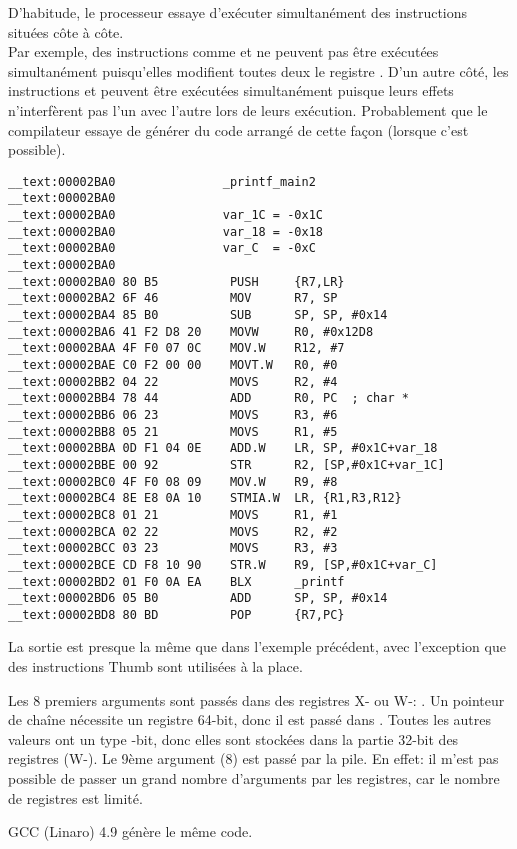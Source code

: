 D'habitude, le processeur essaye d'exécuter simultanément des instructions situées côte à côte.\\
Par exemple, des instructions comme  et  ne
peuvent pas être exécutées simultanément puisqu'elles modifient toutes deux le
registre .
D'un autre côté, les instructions  et  peuvent
être exécutées simultanément puisque leurs effets n'interfèrent pas l'un avec l'autre
lors de leurs exécution.
Probablement que le compilateur essaye de générer du code arrangé de cette façon
(lorsque c'est possible).

\myparagraph{\OptimizingXcodeIV: \ThumbTwoMode}

\begin{lstlisting}[style=customasmARM]
__text:00002BA0               _printf_main2
__text:00002BA0
__text:00002BA0               var_1C = -0x1C
__text:00002BA0               var_18 = -0x18
__text:00002BA0               var_C  = -0xC
__text:00002BA0
__text:00002BA0 80 B5          PUSH     {R7,LR}
__text:00002BA2 6F 46          MOV      R7, SP
__text:00002BA4 85 B0          SUB      SP, SP, #0x14
__text:00002BA6 41 F2 D8 20    MOVW     R0, #0x12D8
__text:00002BAA 4F F0 07 0C    MOV.W    R12, #7
__text:00002BAE C0 F2 00 00    MOVT.W   R0, #0
__text:00002BB2 04 22          MOVS     R2, #4
__text:00002BB4 78 44          ADD      R0, PC  ; char *
__text:00002BB6 06 23          MOVS     R3, #6
__text:00002BB8 05 21          MOVS     R1, #5
__text:00002BBA 0D F1 04 0E    ADD.W    LR, SP, #0x1C+var_18
__text:00002BBE 00 92          STR      R2, [SP,#0x1C+var_1C]
__text:00002BC0 4F F0 08 09    MOV.W    R9, #8
__text:00002BC4 8E E8 0A 10    STMIA.W  LR, {R1,R3,R12}
__text:00002BC8 01 21          MOVS     R1, #1
__text:00002BCA 02 22          MOVS     R2, #2
__text:00002BCC 03 23          MOVS     R3, #3
__text:00002BCE CD F8 10 90    STR.W    R9, [SP,#0x1C+var_C]
__text:00002BD2 01 F0 0A EA    BLX      _printf
__text:00002BD6 05 B0          ADD      SP, SP, #0x14
__text:00002BD8 80 BD          POP      {R7,PC}
\end{lstlisting}

La sortie est presque la même que dans l'exemple précédent, avec l'exception que
des instructions Thumb sont utilisées à la place.





Les 8 premiers arguments sont passés dans des registres X- ou W-: \ARMPCS.
Un pointeur de chaîne nécessite un registre 64-bit, donc il est passé dans .
Toutes les autres valeurs ont un type -bit, donc elles sont stockées dans
la partie 32-bit des registres (W-).
Le 9ème argument (8) est passé par la pile.
En effet: il m'est pas possible de passer un grand nombre d'arguments par les registres,
car le nombre de registres est limité.

GCC (Linaro) 4.9 \Optimizing génère le même code.
